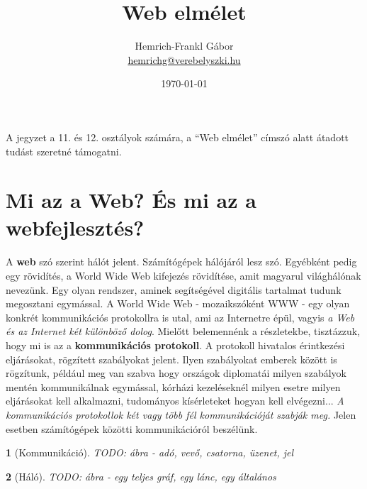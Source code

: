 \documentclass[a4paper, 12pt, oneside]{article}
\title{Web elmélet}
\author{Hemrich-Frankl Gábor \\  \href{mailto:hemrichg@verebelyszki.hu}{hemrichg@verebelyszki.hu}}
\date{\today}
\newtheorem*{defin}{}
\begin{document}
\maketitle
\pagebreak
A jegyzet a 11. és 12. osztályok számára, a ``Web elmélet'' címszó alatt átadott tudást szeretné támogatni.
\pagebreak

\tableofcontents
\pagebreak

\part{Mi az a Web? És mi az a webfejlesztés?}

A \textbf{web} szó szerint hálót jelent. Számítógépek hálójáról lesz szó. Egyébként pedig egy rövidítés, a World Wide Web kifejezés rövidítése, amit magyarul világhálónak nevezünk. Egy olyan rendszer, aminek segítségével digitális tartalmat tudunk megosztani egymással. A World Wide Web - mozaikszóként WWW - egy olyan konkrét kommunikációs protokollra is utal, ami az Internetre épül, vagyis \textit{a Web és az Internet két különböző dolog}.
\bigbreak
Mielőtt belemennénk a részletekbe, tisztázzuk, hogy mi is az a \textbf{kommunikációs protokoll}. A protokoll hivatalos érintkezési eljárásokat, rögzített szabályokat jelent. Ilyen szabályokat emberek között is rögzítunk, például meg van szabva hogy országok diplomatái milyen szabályok mentén kommunikálnak egymással, kórházi kezeléseknél milyen esetre milyen eljárásokat kell alkalmazni, tudományos kísérleteket hogyan kell elvégezni... \textit{A kommunikációs protokollok két vagy több fél kommunikációját szabják meg.} Jelen esetben számítógépek közötti kommunikációról beszélünk.

\begin{center}
\begin{defin}[Kommunikáció]
TODO: ábra - adó, vevő, csatorna, üzenet, jel
\end{defin}
\end{center}

\begin{center}
\begin{defin}[Háló]
TODO: ábra - egy teljes gráf, egy lánc, egy általános
\end{defin}
\end{center}
\end{document}

